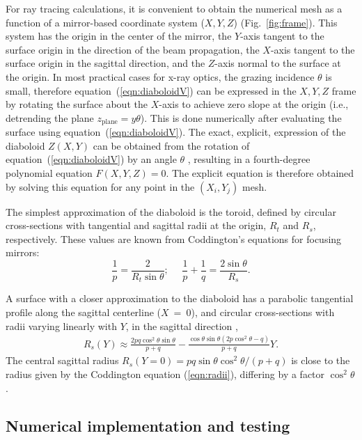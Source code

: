 \documentclass[preprint]{iucr}       %
\newcommand{\inred}[1]{{\color{red}#1}}
\begin{document}
For ray tracing calculations, it is convenient to obtain the numerical mesh as a function of a mirror-based coordinate system ($X,Y,Z$) (Fig.~\ref{fig:frame}). This system has the origin in the center of the mirror, the $Y$-axis tangent to the surface origin in the direction of the beam propagation, the $X$-axis tangent to the surface origin in the sagittal direction, and the $Z$-axis normal to the surface at the origin. In most practical cases for x-ray optics, the grazing incidence $\theta$ is small, therefore equation~(\ref{eqn:diaboloidV}) can be expressed in the $X,Y,Z$ frame by rotating the surface about the $X$-axis to achieve zero slope at the origin (i.e., detrending the plane $z_{\mathrm{plane}}=y \theta$). This is done numerically after evaluating the surface using equation~(\ref{eqn:diaboloidV}). The exact, explicit, expression of the diaboloid $Z(X,Y)$ can be obtained from the rotation of equation~(\ref{eqn:diaboloidV}) by an angle $\theta$ \cite{val2021}, resulting in a fourth-degree polynomial equation $F(X,Y,Z)=0$. The explicit equation is therefore obtained by solving this equation for any point in the $(X_i,Y_j)$ mesh.


The simplest approximation of the diaboloid is the toroid, defined by circular cross-sections with \inred{tangential} and sagittal radii at the origin, $R_t$ and $R_s$, respectively. These values are known from Coddington's equations for focusing mirrors:
\begin{equation}
\label{eqn:radii}
\frac{1}{p} = \frac{2 }{R_t \sin\theta };~~~~~~
\frac{1}{p} + \frac{1}{q} = \frac{2\sin\theta}{ R_s}.
\end{equation}

A surface with a closer approximation to the diaboloid has a parabolic tangential profile along the sagittal centerline ($X$~=~0), and circular cross-sections with radii varying linearly with $Y$, in the sagittal direction \cite{val2021},
\begin{multline}
\label{eq:sagRadius}
R_s(Y) 
\approx 
\frac{2p q \cos^2\theta \sin\theta }{p + q} - 
\frac{\cos\theta \sin\theta (2 p \cos^2\theta - q)}{p + q} Y.
\end{multline}
The central sagittal radius $R_s(Y=0)=p q \sin\theta \cos^2\theta/ (p+q)$ is close to the radius given by the Coddington equation (\ref{eqn:radii}), differing by a factor $\cos^2\theta$.


\subsection{Numerical implementation and testing}
\label{sec:oasys}
\end{document}
